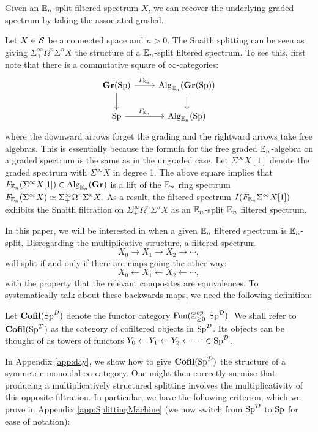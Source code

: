 Given an $\operatorname{\mathbb{E}}_n$-split filtered spectrum $X$, we can recover the underlying graded spectrum by taking the associated graded.  

\begin{exm}\label{exm:snaith}
Let $X\in \operatorname{\mathcal{S}}$ be a connected space and $n>0$.  The Snaith splitting can be seen as giving $\Sigma^{\infty}_+ \Omega^n \Sigma^n X$ the structure of a $\operatorname{\mathbb{E}}_n$-split filtered spectrum.  To see this, first note that there is a commutative square of $\infty$-categories:
$$
\begin{tikzcd}
\Gr(\Sp) \arrow[d]\arrow[r,"F_{\E_n}"]&  \Alg_{\E_n}(\Gr(\Sp)) \arrow[d]\\
\Sp \arrow[r,"F_{\E_n}"] & \Alg_{\E_n}(\Sp) 
\end{tikzcd}
$$
where the downward arrows forget the grading and the rightward arrows take free algebras.  This is essentially because the formula for the free graded $\operatorname{\mathbb{E}}_n$-algebra on a graded spectrum is the same as in the ungraded case.  Let $\Sigma^{\infty} X[1]$ denote the graded spectrum with $\Sigma^{\infty} X$ in degree 1.  The above square implies that $F_{\operatorname{\mathbb{E}}_n}(\Sigma^{\infty} X[1] )\in \operatorname{\mathrm{Alg}}_{\operatorname{\mathbb{E}}_n}(\operatorname{\mathbf{Gr}})$ is a lift of the $\operatorname{\mathbb{E}}_n$ ring spectrum $F_{\operatorname{\mathbb{E}}_n}(\Sigma^{\infty} X) \simeq \Sigma^{\infty}_+ \Omega^n \Sigma^n X.$  As a result, the filtered spectrum $I(F_{\operatorname{\mathbb{E}}_n} \Sigma^{\infty} X[1])$ exhibits the Snaith filtration on $\Sigma^{\infty}_+ \Omega^n \Sigma^n X$ as an $\operatorname{\mathbb{E}}_n$-split $\operatorname{\mathbb{E}}_n$ filtered spectrum.  
\end{exm}

In this paper, we will be interested in when a given $\operatorname{\mathbb{E}}_n$ filtered spectrum is $\operatorname{\mathbb{E}}_n$-split.  Disregarding the multiplicative structure, a filtered spectrum $$X_0\longrightarrow X_1 \longrightarrow X_2 \longrightarrow \cdots ,$$ will split if and only if there are maps going the other way: $$X_0 \longleftarrow X_1 \longleftarrow X_2 \longleftarrow \cdots,$$ with the property that the relevant composites are equivalences.   To systematically talk about these backwards maps, we need the following definition:

\begin{dfn} Let $\operatorname{\mathbf{Cofil}}(\operatorname{\mathrm{Sp}}^{\operatorname{\mathcal{D}}})$ denote the functor category $\operatorname{\text{Fun}}(\operatorname{\mathbb{Z}}_{\geq 0}^{op}, \operatorname{\mathrm{Sp}}^{\operatorname{\mathcal{D}}}).$  We shall refer to $\operatorname{\mathbf{Cofil}}(\operatorname{\mathrm{Sp}}^{\operatorname{\mathcal{D}}})$ as the category of cofiltered objects in $\operatorname{\mathrm{Sp}}^{\operatorname{\mathcal{D}}}$.  Its objects can be thought of as towers of functors $Y_0\leftarrow Y_1\leftarrow Y_2 \leftarrow \cdots \in \operatorname{\mathrm{Sp}}^{\operatorname{\mathcal{D}}}$.
\end{dfn}

In Appendix \ref{app:day}, we show how to give $\operatorname{\mathbf{Cofil}}(\operatorname{\mathrm{Sp}}^{\operatorname{\mathcal{D}}})$ the structure of a symmetric monoidal $\infty$-category.  One might then correctly surmise that producing a multiplicatively structured splitting involves the multiplicativity of this opposite filtration.  In particular, we have the following criterion, which we prove in Appendix \ref{app:SplittingMachine} (we now switch from $\operatorname{\mathrm{Sp}}^{\operatorname{\mathcal{D}}}$ to $\operatorname{\mathrm{Sp}}$ for ease of notation):

